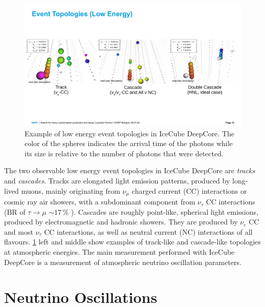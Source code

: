 \documentclass[a4paper,11pt]{article}
\begin{document}
\begin{figure}[h!]
    \includegraphics[trim = 0cm 4.5cm 0cm 5.5cm, clip, width=1.0\linewidth]{figures/event_views_all_three.png}
    \caption{Example of low energy event topologies in IceCube DeepCore. The color of the spheres indicates the arrival time of the photons while its size is relative to the number of photons that were detected.}
    \label{fig:low_energy_eventviews}
  \end{figure}

The two observable low energy event topologies in IceCube DeepCore are \textit{tracks} and \textit{cascades}. Tracks are elongated light emission patterns, produced by long-lived muons, mainly originating from $\nu_{\mu}$ charged current (CC) interactions or cosmic ray air showers, with a subdominant component from $\nu_{\tau}$ CC interactions (BR of $\tau\rightarrow\mu$ $\sim17\,\%$ \cite{PhysRevD.98.030001}). Cascades are roughly point-like, spherical light emissions, produced by electromagnetic and hadronic showers. They are produced by $\nu_{e}$ CC and most $\nu_{\tau}$ CC interactions, as well as neutral current (NC) interactions of all flavours. \cref{fig:low_energy_eventviews} left and middle show examples of track-like and cascade-like topologies at atmospheric energies. The main measurement performed with IceCube DeepCore is a measurement of atmospheric neutrino oscillation parameters.


\vspace{-0.5cm}
\section{Neutrino Oscillations} \label{sec:neutrino_oscillations}
\end{document}
